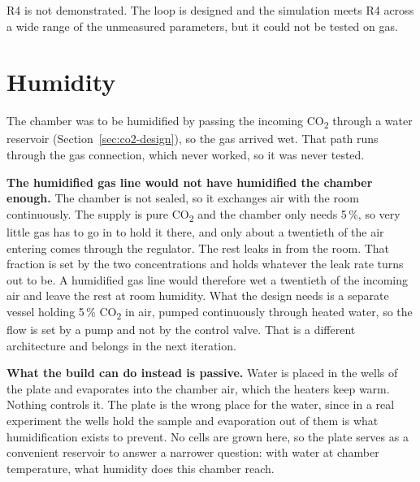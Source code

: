 R4 is not demonstrated. The loop is designed and the simulation meets R4 across a wide range of the unmeasured parameters, but it could not be tested on gas.

\section{Humidity}
\label{sec:humidity}

The chamber was to be humidified by passing the incoming CO\textsubscript{2} through a water reservoir (Section~\ref{sec:co2-design}), so the gas arrived wet. That path runs through the gas connection, which never worked, so it was never tested.

\textbf{The humidified gas line would not have humidified the chamber enough.} The chamber is not sealed, so it exchanges air with the room continuously. The supply is pure CO\textsubscript{2} and the chamber only needs 5\,\%, so very little gas has to go in to hold it there, and only about a twentieth of the air entering comes through the regulator. The rest leaks in from the room. That fraction is set by the two concentrations and holds whatever the leak rate turns out to be. A humidified gas line would therefore wet a twentieth of the incoming air and leave the rest at room humidity. What the design needs is a separate vessel holding 5\,\% CO\textsubscript{2} in air, pumped continuously through heated water, so the flow is set by a pump and not by the control valve. That is a different architecture and belongs in the next iteration.

\textbf{What the build can do instead is passive.} Water is placed in the wells of the plate and evaporates into the chamber air, which the heaters keep warm. Nothing controls it. The plate is the wrong place for the water, since in a real experiment the wells hold the sample and evaporation out of them is what humidification exists to prevent. No cells are grown here, so the plate serves as a convenient reservoir to answer a narrower question: with water at chamber temperature, what humidity does this chamber reach.


